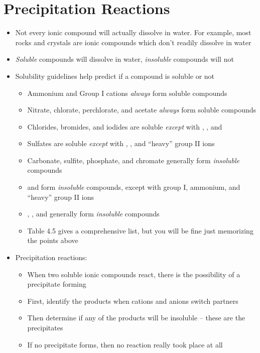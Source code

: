 \documentclass[12pt, openany, letterpaper]{memoir}
\begin{document}
\section{Precipitation Reactions}
\begin{itemize}
	\item Not every ionic compound will actually dissolve in water. For example, most rocks and crystals are ionic compounds which don't readily dissolve in water
	\item \emph{Soluble} compounds will dissolve in water, \emph{insoluble} compounds will not
	\item Solubility guidelines help predict if a compound is soluble or not
	\begin{itemize}
		\item Ammonium and Group I cations \emph{always} form soluble compounds
		\item Nitrate, chlorate, perchlorate, and acetate \emph{always} form soluble compounds
		\item Chlorides, bromides, and iodides are soluble \emph{except} with , , and 
		\item Sulfates are soluble \emph{except} with , , and ``heavy'' group II ions
		\item Carbonate, sulfite, phosphate, and chromate generally form \emph{insoluble} compounds
		\item {} and  form \emph{insoluble} compounds, except with group I, ammonium, and ``heavy'' group II ions
		\item {}, , and  generally form \emph{insoluble} compounds
		\item Table 4.5 gives a comprehensive list, but you will be fine just memorizing the points above
	\end{itemize}
	\item Precipitation reactions:
	\begin{itemize}
		\item When two soluble ionic compounds react, there is the possibility of a precipitate forming
		\item First, identify the products when cations and anions switch partners
		\item Then determine if any of the products will be insoluble -- these are the precipitates
		\item If no precipitate forms, then no reaction really took place at all
	\end{itemize}

\end{itemize}
\end{document}
